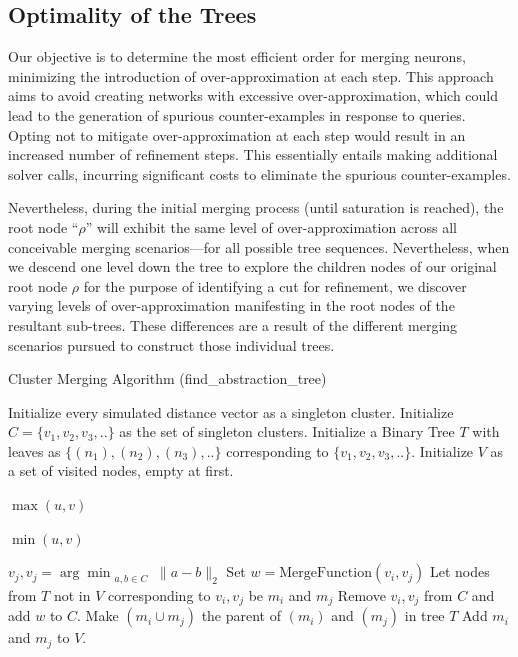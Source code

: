 \subsection{Optimality of the Trees}
Our objective is to determine the most efficient order for merging neurons, minimizing the introduction of over-approximation at each step. This approach aims to avoid creating networks with excessive over-approximation, which could lead to the generation of spurious counter-examples in response to queries. Opting not to mitigate over-approximation at each step would result in an increased number of refinement steps. This essentially entails making additional solver calls, incurring significant costs to eliminate the spurious counter-examples.


Nevertheless, during the initial merging process (until saturation is reached), the root node ``$\rho$'' will exhibit the same level of over-approximation across all conceivable merging scenarios—for all possible tree sequences. Nevertheless, when we descend one level down the tree to explore the children nodes of our original root node $\rho$ for the purpose of identifying a cut for refinement, we discover varying levels of over-approximation manifesting in the root nodes of the resultant sub-trees. These differences are a result of the different merging scenarios pursued to construct those individual trees.

\begin{algorithm}[H]
\caption{Cluster Merging Algorithm (find\_abstraction\_tree)}
\label{Cluster Merging Algorithm}
\begin{algorithmic}[1]
    \State Initialize every simulated distance vector as a singleton cluster.
    \State Initialize $C=\{v_1,v_2,v_3,..\}$ as the set of singleton clusters.
    \State Initialize a Binary Tree $T$ with leaves as $\{(n_1),(n_2),(n_3),..\}$ corresponding to $\{v_1,v_2,v_3,..\}$.
    \State Initialize $V$ as a set of visited nodes, empty at first.
    
        {
        
            \Return $\max(u, v)$
        }
        \Else{ }
        {
        
            \Return $\min(u, v)$
        }
        \EndIf
    \EndFunction
    
        \State $v_j, v_j = \arg\min_{\substack{a, b \in C}} \| a - b \|_2$
        \State Set $w=\text{MergeFunction}(v_i,v_j)$
        \State Let nodes from $T$ not in $V$ corresponding to $v_i,v_j$ be $m_i$ and $m_j$
        \State Remove $v_i,v_j$ from $C$ and add $w$ to $C$.
        \State Make $(m_i \cup m_j)$ the parent of $(m_i)$ and $(m_j)$ in tree $T$
        \State Add $m_i$ and $m_j$ to $V$.
    \EndWhile
\end{algorithmic}
\end{algorithm}

